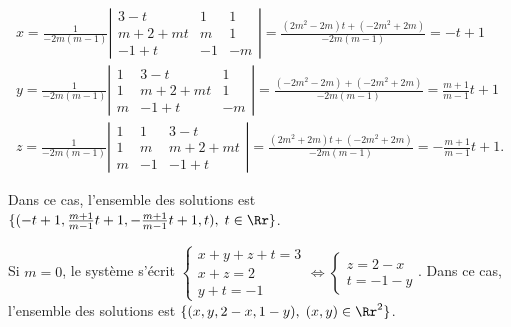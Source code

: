 {{$$\begin{array}{l}
x=\frac{1}{-2m(m-1)}\left|
\begin{array}{ccc}
3-t&1&1\\
m+2+mt&m&1\\
-1+t&-1&-m
\end{array}\right|=\frac{(2m^2-2m)t+(-2m^2+2m)}{-2m(m-1)}=-t+1\\
y=\frac{1}{-2m(m-1)}\left|
\begin{array}{ccc}
1&3-t&1\\
1&m+2+mt&1\\
m&-1+t&-m
\end{array}\right|=\frac{(-2m^2-2m)+(-2m^2+2m)}{-2m(m-1)}=\frac{m+1}{m-1}t+1\\
z=\frac{1}{-2m(m-1)}\left|
\begin{array}{ccc}
1&1&3-t\\
1&m&m+2+mt\\
m&-1&-1+t
\end{array}\right|=\frac{(2m^2+2m)t+(-2m^2+2m)}{-2m(m-1)}=-\frac{m+1}{m-1}t+1.
\end{array}$$

Dans ce cas, l'ensemble des solutions est $\{(-t+1,\frac{m+1}{m-1}t+1,-\frac{m+1}{m-1}t+1,t),\;t\in\Rr\}$.

Si $m=0$, le système s'écrit $\left\{
\begin{array}{l}
x+y+z+t=3\\
x+z=2\\
y+t=-1
\end{array}
\right.\Leftrightarrow \left\{
\begin{array}{l}
z=2-x\\
t=-1-y
\end{array}
\right.$. Dans ce cas, l'ensemble des solutions est $\{(x,y,2-x,1-y),\;(x,y)\in\Rr^2\}$.

}}
